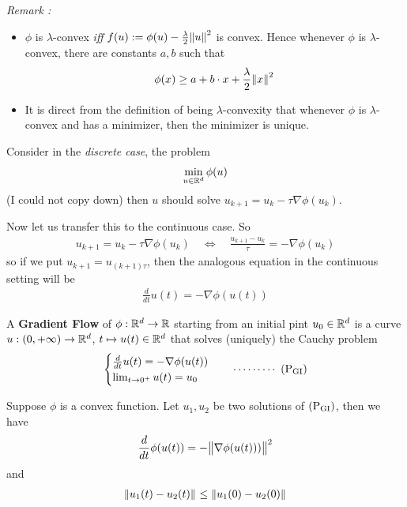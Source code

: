 \documentclass[12pt,a4paper]{article}
\begin{document}
\emph{Remark :}
\begin{itemize}
\item $\phi$ is $\lambda$-convex \emph{iff} $f(u) := \phi(u) - \frac{\lambda}{2} \snorms{u}{}^2$ is convex. Hence whenever $\phi$ is $\lambda$-convex, there are constants $a,b$ such that
\begin{align*}
\phi(x) \geq a+ b\cdot x + \frac{\lambda}{2} \snorms{x}{}^2
\end{align*}
\item It is direct from the definition of being $\lambda$-convexity that whenever $\phi$ is $\lambda$-convex and has a minimizer, then the minimizer is unique.
\end{itemize} 
\s

Consider in the \emph{discrete case}, the problem
\begin{align*}
\min_{u\in \mathbb{R}^d} \phi(u)
\end{align*}
(I could not copy down) then $u$ should solve $u_{k+1} = u_k - \tau \nabla \phi(u_k)$.
\s

Now let us transfer this to the continuous case. So
\begin{align*}
u_{k+1} = u_k - \tau \nabla \phi(u_k) \quad \Leftrightarrow \quad \frac{u_{k+1} - u_k}{\tau} = - \nabla \phi(u_k)
\end{align*}
so if we put $u_{k+1} = u_{(k+1)\tau}$, then the analogous equation in the continuous setting will be
\begin{align*}
\frac{d}{dt} u(t) = - \nabla \phi(u(t))
\end{align*}
\s

 A \textbf{Gradient Flow} of $\phi : \mathbb{R}^d \rightarrow \mathbb{R}$ starting from an initial pint $u_0 \in \mathbb{R}^d$ is a curve $u: (0, +\infty) \rightarrow \mathbb{R}^d$, $t \mapsto u(t) \in \mathbb{R}^d$ that solves (uniquely) the Cauchy problem
\begin{align*}
\begin{cases}
\frac{d}{dt} u(t) = - \nabla \phi(u(t)) \\
\lim_{t\rightarrow 0^+} u(t) = u_0 
\end{cases} \quad \cdots\cdots\cdots\,\,(\text{P}_{\text{GI}})
\end{align*}
\s

 Suppose $\phi$ is a convex function. Let $u_1, u_2$ be two solutions of $(\text{P}_{\text{GI}})$, then we have
\begin{align*}
\frac{d}{dt} \phi(u(t)) = -\bigl\lVert\nabla \phi(u(t)))\bigr\rVert_{}^2
\end{align*}
and
\begin{align*}
\snorms{u_1(t) - u_2(t)}{} \leq \snorms{u_1(0)- u_2(0)}{}
\end{align*}
\end{document}
